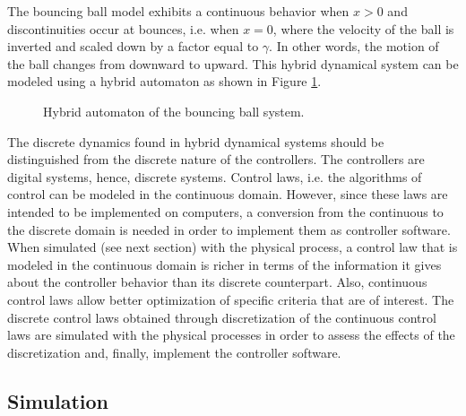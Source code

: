 The bouncing ball model exhibits a continuous behavior when $x > 0$ and discontinuities occur at bounces, i.e. when $x = 0$, where the velocity of the ball is inverted and scaled down by a factor equal to $\gamma$. In other words, the motion of the ball changes from downward to upward. This hybrid dynamical system can be modeled using a hybrid automaton as shown in Figure \ref{fig:bbautomaton}.

\begin{figure}[phbt]
\centering

\caption{Hybrid automaton of the bouncing ball system.}
\label{fig:bbautomaton}
\end{figure}

The discrete dynamics found in hybrid dynamical systems should be distinguished from the discrete nature of the controllers. The controllers are digital systems, hence, discrete systems. Control laws, i.e. the algorithms of control can be modeled in the continuous domain. However, since these laws are intended to be implemented on computers, a conversion from the continuous to the discrete domain is needed in order to implement them as controller software. When simulated (see next section) with the physical process, a control law that is modeled in the continuous domain is richer in terms of the information it gives about the controller behavior than its discrete counterpart. Also, continuous control laws allow better optimization of specific criteria that are of interest. The discrete control laws obtained through discretization of the continuous control laws are simulated with the physical processes in order to assess the effects of the discretization and, finally, implement the controller software.

\subsection{Simulation}


